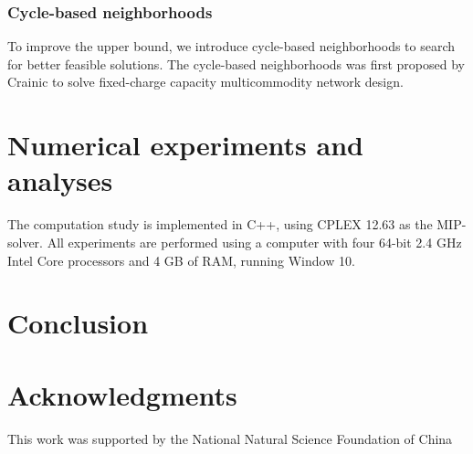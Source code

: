 \documentclass[11pt,nonblindrev,fleqn]{article}
\begin{document}
\subsubsection{Cycle-based neighborhoods}
To improve the upper bound, we introduce cycle-based neighborhoods to search for better feasible solutions. The cycle-based neighborhoods was first proposed by Crainic to solve fixed-charge capacity multicommodity network design.

\section{Numerical experiments and analyses}
The computation study is implemented in C++, using CPLEX 12.63 as the MIP-solver. All experiments are performed using a computer with four 64-bit 2.4 GHz Intel Core processors and 4 GB of RAM, running Window 10.

\section{Conclusion}

\section*{Acknowledgments}

This work was supported by the National Natural Science Foundation of China
\end{document}
